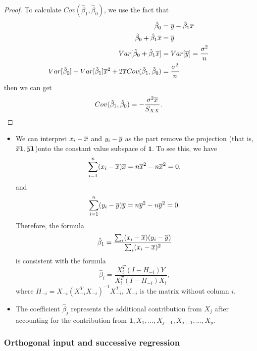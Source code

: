 \begin{refsection}
\begin{proof}
To calculate $Cov(\hat{\beta}_1,\hat{\beta}_0)$, we use the fact that
\begin{align*}
\hat{\beta}_0 &= \overline{y} - \hat{\beta}_1\overline{x} \\
\hat{\beta}_0 + \hat{\beta}_1\overline{x} &= \overline{y}  \\
Var[\hat{\beta}_0 + \hat{\beta}_1\overline{x}] &= Var[\overline{y}] = \frac{\sigma^2}{n} \\
Var[\hat{\beta}_0] + Var[\hat{\beta}_1]\overline{x}^2 + 2\overline{x}Cov(\hat{\beta}_1,\hat{\beta}_0) &= \frac{\sigma^2}{n} 
\end{align*}
then we can get 
$$Cov(\hat{\beta}_1,\hat{\beta}_0) = -\frac{\sigma^2\overline{x}}{S_{XX}}.$$
\end{proof}

\begin{remark}[interpretation]\hfill
\begin{itemize}
	\item We can interpret $x_i-\overline{x}$ and $y_i-\overline{y}$ as the part remove the projection (that is, $\overline{x}\bm{1}, \overline{y}\bm{1}$)onto the constant value subspace of $\bm{1}$. To see this, we have
	$$\sum_{i=1}^{n}(x_i - \overline{x})\overline{x} = n\overline{x}^2-n\overline{x}^2 = 0,$$
	and
		$$\sum_{i=1}^{n}(y_i - \overline{y})\overline{y} = n\overline{y}^2-n\overline{y}^2 = 0.$$
	Therefore, the formula 
	$$\hat{\beta}_1 = \frac{\sum_i (x_{i}-\overline{x})(y_i - \overline{y})}{\sum_i (x_{i}-\overline{x})^2}$$
	is consistent with the formula
	$$\hat{\beta}_i = \frac{X_i^T(I - H_{-i})Y}{X_i^T(I-H_{-i})X_i},$$
	where $H_{-i} = X_{-i}(X_{-i}^TX_{-i})^{-1} X_{-i}^T$, $X_{-i}$ is the matrix without column $i$.
	\item The coefficient $\hat{\beta}_j$ represents the additional contribution from $X_j$ after accounting for the contribution from $\bm{1},X_1,...,X_{j-1}, X_{j+1},...,X_p$.
\end{itemize}	

\end{remark}

\subsubsection{Orthogonal input and successive regression}



\end{refsection}
